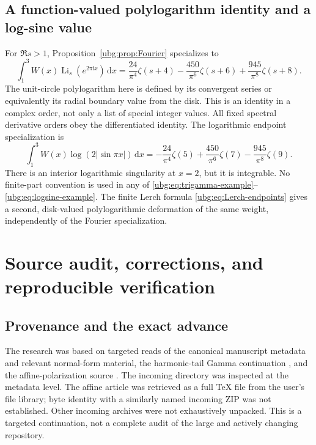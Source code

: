 \documentclass[11pt,letterpaper]{article}
\numberwithin{equation}{section}
\theoremstyle{definition}\newtheorem{definition}[theorem]{Definition}
\theoremstyle{remark}\newtheorem{remark}[theorem]{Remark}
\newcommand{\dd}{\,\mathrm d}\newcommand{\ii}{\mathrm i}
\DeclareMathOperator{\Li}{Li}\DeclareMathOperator{\FP}{FP}
\begin{document}
\subsection{A function-valued polylogarithm identity and a log-sine value}
For $\Re s>1$, Proposition~\ref{ubg:prop:Fourier} specializes to
\begin{equation}\label{ubg:eq:polylog-example}
 \boxed{\displaystyle
 \int_1^3W(x)\Li_s(e^{2\pi\ii x})\dd x
    =\frac{24}{\pi^4}\zeta(s+4)
      -\frac{450}{\pi^6}\zeta(s+6)
      +\frac{945}{\pi^8}\zeta(s+8).}
\end{equation}
The unit-circle polylogarithm here is defined by its convergent series
or equivalently its radial boundary value from the disk. This is an
identity in a complex order, not only a list of special integer values.
All fixed spectral derivative orders obey the differentiated identity.
The logarithmic endpoint specialization is
\begin{equation}\label{ubg:eq:logsine-example}
 \boxed{\displaystyle
 \int_1^3W(x)\log(2|\sin\pi x|)\dd x
   =-\frac{24}{\pi^4}\zeta(5)
      +\frac{450}{\pi^6}\zeta(7)
      -\frac{945}{\pi^8}\zeta(9).}
\end{equation}
There is an interior logarithmic singularity at $x=2$, but it is
integrable. No finite-part convention is used in any of
\eqref{ubg:eq:trigamma-example}--\eqref{ubg:eq:logsine-example}.
The finite Lerch formula \eqref{ubg:eq:Lerch-endpoints} gives a second,
disk-valued polylogarithmic deformation of the same weight, independently
of the Fourier specialization.

\section{Source audit, corrections, and reproducible verification}
\label{ubg:sec:audit}

\subsection{Provenance and the exact advance}
The research was based on targeted reads of the canonical manuscript
metadata and relevant normal-form material, the harmonic-tail Gamma
continuation \cite{HTG}, and the affine-polarization source
\cite{Affine}. The incoming directory was inspected at the metadata
level. The affine article was retrieved as a full TeX file from the
user's file library; byte identity with a similarly named incoming ZIP
was not established. Other incoming archives were not exhaustively
unpacked. This is a targeted continuation, not a complete audit of the
large and actively changing repository.
\end{document}
